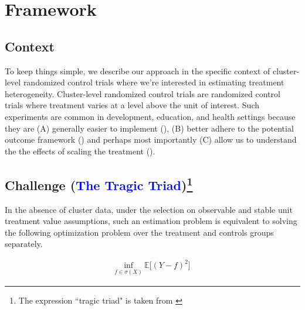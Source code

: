 \documentclass[a4paper,12pt]{article}
\begin{document}
\section{Framework}
\label{sec:framework}
\subsection{Context}
To keep things simple, we describe our approach in the specific context of cluster-level randomized control trials where we're interested in estimating treatment heterogeneity. Cluster-level randomized control trials are randomized control trials where treatment varies at a level above the unit of interest. Such experiments are common in development, education, and health settings because they are (A) generally easier to implement (\cite{gerber2012field}), (B) better adhere to the potential outcome framework (\cite{imbens2015causal}) and perhaps most importantly (C) allow us to understand the the effects of scaling the treatment (\cite{list2021voltage}). 


\subsection{Challenge (\textcolor{blue}{The Tragic Triad})\footnote{The expression ``tragic triad" is taken from \cite{yu2020gradient}}}
In the absence of cluster data, under the selection on observable and stable unit treatment value assumptions, such an estimation problem is equivalent to solving the following optimization problem over the treatment and controls groups separately. 

\begin{align*}
    \underset{f \in \sigma(X)}{\textrm{inf}} \ \mathbb{E}\big[(Y-f )^2\big] 
\end{align*}
 
\end{document}
